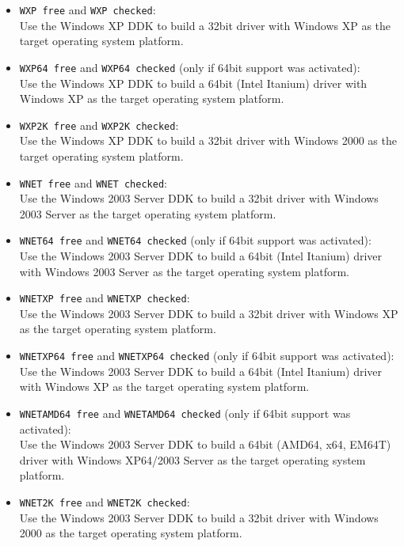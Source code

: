 \documentclass[a4paper,titlepage]{report}
\newcommand{\solcfg}[2]{\texttt{#1 free} and \texttt{#1 checked}:\\#2}
\newcommand{\solcfgsixfour}[2]{\texttt{#1 free} and \texttt{#1 checked} \textcolor[gray]{0.40}{\textsf{\small(only if 64bit support was activated)}}:\\#2}
\begin{document}
\begin{itemize}
  \item \solcfg{WXP}{Use the Windows XP DDK to build a 32bit driver with Windows XP as the target operating system platform.}
  \item \solcfgsixfour{WXP64}{Use the Windows XP DDK to build a 64bit (Intel Itanium) driver with Windows XP as the target operating system platform.}
  \item \solcfg{WXP2K}{Use the Windows XP DDK to build a 32bit driver with Windows 2000 as the target operating system platform.}

  \item \solcfg{WNET}{Use the Windows 2003 Server DDK to build a 32bit driver with Windows 2003 Server as the target operating system platform.}
  \item \solcfgsixfour{WNET64}{Use the Windows 2003 Server DDK to build a 64bit (Intel Itanium) driver with Windows 2003 Server as the target operating system platform.}
  \item \solcfg{WNETXP}{Use the Windows 2003 Server DDK to build a 32bit driver with Windows XP as the target operating system platform.}
  \item \solcfgsixfour{WNETXP64}{Use the Windows 2003 Server DDK to build a 64bit (Intel Itanium) driver with Windows XP as the target operating system platform.}
  \item \solcfgsixfour{WNETAMD64}{Use the Windows 2003 Server DDK to build a 64bit (AMD64, x64, EM64T) driver with Windows XP64/2003 Server as the target operating system platform.}
  \item \solcfg{WNET2K}{Use the Windows 2003 Server DDK to build a 32bit driver with Windows 2000 as the target operating system platform.}


\end{itemize}
\end{document}
